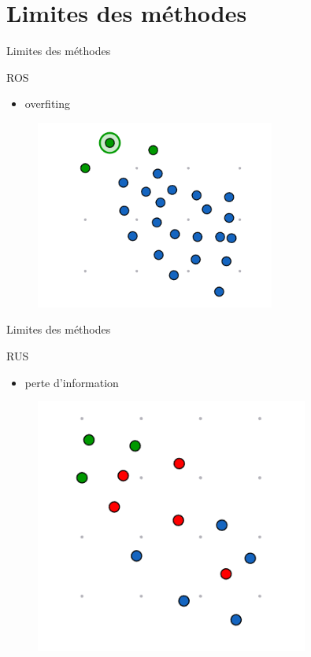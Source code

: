 \documentclass{beamer}
\begin{document}
\section{Limites des méthodes}

\begin{frame}{Limites des méthodes}
\begin{block}{ROS}
    \begin{itemize}
       \item overfiting
   \end{itemize} 
\end{block}
    \begin{figure}
    \centering
    \includegraphics[width=0.7\textwidth]{images/lROS.png}
     
\end{figure}
\end{frame}

\begin{frame}{Limites des méthodes}
\begin{block}{RUS}
    \begin{itemize}
    \item perte d'information
   \end{itemize}
\end{block}
    \begin{figure}
    \centering
    \includegraphics[width=0.8\textwidth]{images/lrus.png}

\end{figure}
\end{frame}
\end{document}
